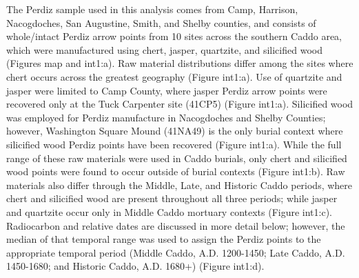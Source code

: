 \documentclass[review]{elsarticle}
\begin{document}
The Perdiz sample used in this analysis comes from Camp, Harrison, Nacogdoches, San Augustine, Smith, and Shelby counties, and consists of whole/intact Perdiz arrow points from 10 sites across the southern Caddo area, which were manufactured using chert, jasper, quartzite, and silicified wood (Figures map and int1:a). Raw material distributions differ among the sites where chert occurs across the greatest geography (Figure int1:a). Use of quartzite and jasper were limited to Camp County, where jasper Perdiz arrow points were recovered only at the Tuck Carpenter site (41CP5) (Figure int1:a). Silicified wood was employed for Perdiz manufacture in Nacogdoches and Shelby Counties; however, Washington Square Mound (41NA49) is the only burial context where silicified wood Perdiz points have been recovered (Figure int1:a). While the full range of these raw materials were used in Caddo burials, only chert and silicified wood points were found to occur outside of burial contexts (Figure int1:b). Raw materials also differ through the Middle, Late, and Historic Caddo periods, where chert and silicified wood are present throughout all three periods; while jasper and quartzite occur only in Middle Caddo mortuary contexts (Figure int1:c). Radiocarbon and relative dates are discussed in more detail below; however, the median of that temporal range was used to assign the Perdiz points to the appropriate temporal period (Middle Caddo, A.D. 1200-1450; Late Caddo, A.D. 1450-1680; and Historic Caddo, A.D. 1680+) (Figure int1:d).
\end{document}
